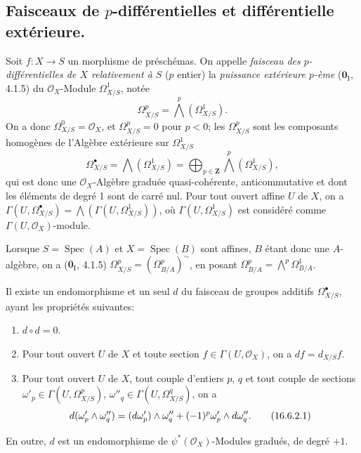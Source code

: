 \subsection{\texorpdfstring{Faisceaux de $p$-différentielles et différentielle extérieure.}{Faisceaux de p-différentielles et différentielle extérieure.}}

\begin{env}[16.6.1]
Soit $f:X\to S$ un morphisme de préschémas. On appelle \emph{faisceau des
$p$-différentielles de $X$ relativement à $S$} ($p$ entier) la
\emph{puissance extérieure $p$-ème} ($\mathbf{0}_{\mathrm I}$, 4.1.5) du $\mathcal{O}_X$-Module
$\varOmega_{X/S}^1$, notée
\[
  \varOmega_{X/S}^p=\bigwedge^p(\varOmega_{X/S}^1).
  \tag{16.6.1.1}
  \label{IV.16.6.1.1}
\]
On a donc $\varOmega_{X/S}^0=\mathcal{O}_X$, et $\varOmega_{X/S}^p=0$ pour $p<0$;
les $\varOmega_{X/S}^p$ sont les composants homogènes de l'Algèbre extérieure
sur $\varOmega_{X/S}^1$
\[
  \varOmega_{X/S}^{\bullet}=\bigwedge(\varOmega_{X/S}^1)
  =\bigoplus_{p\in\mathbf{Z}}\bigwedge^p(\varOmega_{X/S}^1),
  \tag{16.6.1.2}
  \label{IV.16.6.1.2}
\]
qui est donc une $\mathcal{O}_X$-Algèbre graduée quasi-cohérente,
anticommutative et dont les éléments de degré 1 sont de carré nul. Pour tout
ouvert affine $U$ de $X$, on a
$\Gamma(U,\varOmega_{X/S}^{\bullet})=\bigwedge(\Gamma(U,\varOmega_{X/S}^1))$,
où $\Gamma(U,\varOmega_{X/S}^1)$ est considéré comme
$\Gamma(U,\mathcal{O}_X)$-module.

Lorsque $S=\operatorname{Spec}(A)$ et $X=\operatorname{Spec}(B)$ sont
affines, $B$ étant donc une $A$-algèbre, on a ($\mathbf{0}_{\mathrm I}$, 4.1.5)
$\varOmega_{X/S}^p=(\Omega_{B/A}^p)^{\sim}$, en posant
$\Omega_{B/A}^p=\bigwedge^p\Omega_{B/A}^1$.
\end{env}

\begin{theorem}[16.6.2]
\label{IV.16.6.2}
Il existe un endomorphisme et un seul $d$ du faisceau de groupes additifs
$\varOmega_{X/S}^{\bullet}$, ayant les propriétés suivantes:
\begin{enumerate}
\item[\textup{(i)}] $d\circ d=0$.
\item[\textup{(ii)}] Pour tout ouvert $U$ de $X$ et toute section
$f\in\Gamma(U,\mathcal{O}_X)$, on a $df=d_{X/S}f$.
\item[\textup{(iii)}] Pour tout ouvert $U$ de $X$, tout couple d'entiers $p$, $q$ et
tout couple de sections
$\omega'_p\in\Gamma(U,\varOmega_{X/S}^p)$,
$\omega''_q\in\Gamma(U,\varOmega_{X/S}^q)$, on a
\[
  d(\omega'_p\wedge\omega''_q)
  =(d\omega'_p)\wedge\omega''_q
  +(- 1)^p\omega'_p\wedge d\omega''_q.
  \tag{16.6.2.1}
  \label{IV.16.6.2.1}
\]
\end{enumerate}
En outre, $d$ est un endomorphisme de $\psi^*(\mathcal{O}_X)$-Modules
gradués, de degré $+1$.
\end{theorem}

